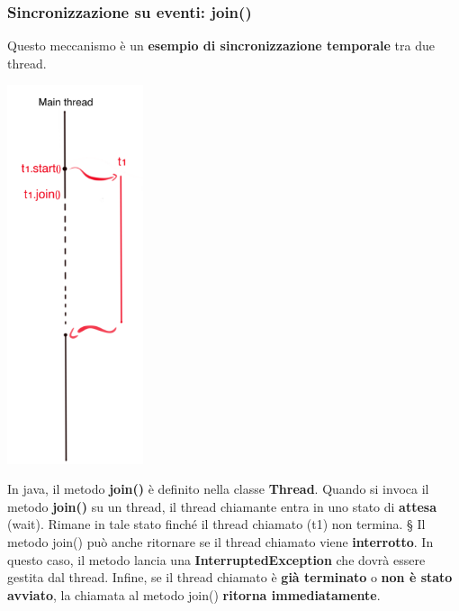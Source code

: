 \documentclass[12pt]{article}
\begin{document}
\subsubsection{Sincronizzazione su eventi: join()}
Questo meccanismo è un \textbf{esempio di sincronizzazione temporale} tra due thread.
\begin{center}
    \includegraphics[width = 0.30\textwidth]{Images/81.PNG}
\end{center}
In java, il metodo \textbf{join()} è definito nella classe \textbf{Thread}. Quando si invoca il metodo \textbf{join()} su un thread, il thread chiamante entra in uno stato di \textbf{attesa} (wait). Rimane in tale stato finché il thread chiamato (t1) non termina. § Il metodo join() può anche ritornare se il thread chiamato viene \textbf{interrotto}. In questo caso, il metodo lancia una \textbf{InterruptedException} che dovrà essere gestita dal thread. Infine, se il thread chiamato è \textbf{già terminato} o \textbf{non è stato avviato}, la
chiamata al metodo join() \textbf{ritorna immediatamente}.
\end{document}
